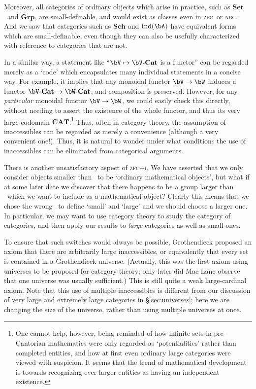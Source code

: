 \documentclass[12pt]{amsart}
\newcommand{\Set}{\ensuremath{\mathbf{Set}}}
\def\zfc{\textsc{zfc}}
\def\zfci{\textsc{zfc+i}}
\def\nbg{\textsc{nbg}}
\begin{document}
Moreover, all categories of ordinary objects which arise in practice,
such as \Set\ and $\mathbf{Grp}$, are small-definable, and would exist
as classes even in \zfc\ or \nbg.  And we saw that categories such as
$\mathbf{Sch}$ and $\operatorname{Ind}(\bA)$ have equivalent forms
which are small-definable, even though they can also be usefully
characterized with reference to categories that are not.

In a similar way, a statement like
``$\bV\mapsto\bV\text{-}\mathbf{Cat}$ is a functor'' can be regarded
merely as a `code' which encapsulates many individual statements in a
concise way.  For example, it implies that any monoidal functor
$\bV\to\bW$ induces a functor $\bV\text{-}\mathbf{Cat}\to
\bW\text{-}\mathbf{Cat}$, and composition is preserved.  However, for
any \emph{particular} monoidal functor $\bV\to \bW$, we could easily
check this directly, without needing to assert the existence of the
whole functor, and thus its very large codomain
$\mathbf{CAT}$.\footnote{One cannot help, however, being reminded of
  how infinite sets in pre-Cantorian mathematics were only regarded as
  `potentialities' rather than completed entities, and how at first
  even ordinary large categories were viewed with suspicion.  It seems
  that the trend of mathematical development is towards recognizing
  ever larger entities as having an independent existence.}  Thus,
often in category theory, the assumption of inaccessibles can be
regarded as merely a convenience (although a very convenient one!).
Thus, it is natural to wonder under what conditions the use of
inaccessibles can be eliminated from categorical arguments.

There is another unsatisfactory aspect of \zfci.  We have asserted
that we only consider objects smaller than \ka\ to be `ordinary
mathematical objects', but what if at some later date we discover that
there happens to be a group larger than \ka\ which we want to include
as a mathematical object?  Clearly this means that we chose the wrong
\ka\ to define `small' and `large' and we should choose a larger one.
In particular, we may want to use category theory to study the
category of categories, and then apply our results to \emph{large}
categories as well as small ones.

To ensure that such switches would always be possible, Grothendieck
proposed an axiom that there are arbitrarily large inaccessibles, or
equivalently that every set is contained in a Grothendieck universe.
(Actually, this was the first axiom using universes to be proposed for
category theory; only later did Mac Lane observe that one universe was
usually sufficient.)  This is still quite a weak large-cardinal axiom.
Note that this use of multiple inaccessibles is different from our
discussion of very large and extremely large categories in
\S\ref{sec:universes}; here we are changing the size of the universe,
rather than using multiple universes at once.
\end{document}
